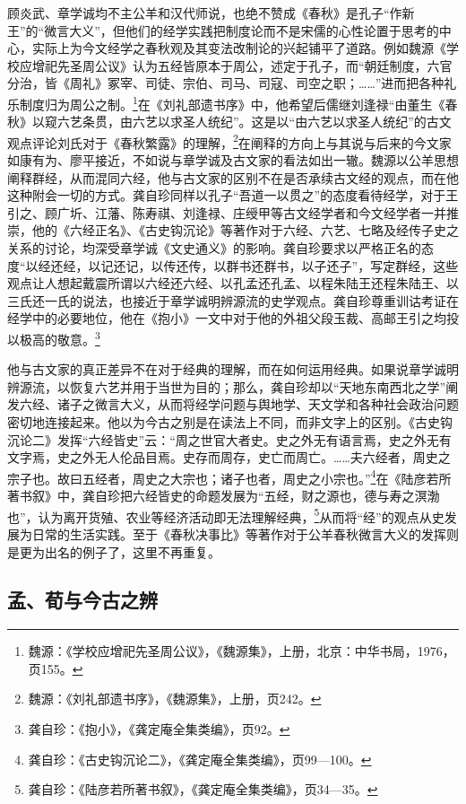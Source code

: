 \documentclass[a4paper, 12pt, openright]{ctexbook}
\begin{document}
顾炎武、章学诚均不主公羊和汉代师说，也绝不赞成《春秋》是孔子“作新王”的“微言大义”，但他们的经学实践把制度论而不是宋儒的心性论置于思考的中心，实际上为今文经学之春秋观及其变法改制论的兴起铺平了道路。例如魏源《学校应增祀先圣周公议》认为五经皆原本于周公，述定于孔子，而“朝廷制度，六官分治，皆《周礼》冢宰、司徒、宗伯、司马、司寇、司空之职；……”进而把各种礼乐制度归为周公之制。\footnote{魏源：《学校应增祀先圣周公议》，《魏源集》，上册，北京：中华书局，1976，页155。}在《刘礼部遗书序》中，他希望后儒继刘逢禄“由董生《春秋》以窥六艺条贯，由六艺以求圣人统纪”。这是以“由六艺以求圣人统纪”的古文观点评论刘氏对于《春秋繁露》的理解，\footnote{魏源：《刘礼部遗书序》，《魏源集》，上册，页242。}在阐释的方向上与其说与后来的今文家如康有为、廖平接近，不如说与章学诚及古文家的看法如出一辙。魏源以公羊思想阐释群经，从而混同六经，他与古文家的区别不在是否承续古文经的观点，而在他这种附会一切的方式。龚自珍同样以孔子“吾道一以贯之”的态度看待经学，对于王引之、顾广圻、江藩、陈寿祺、刘逢禄、庄绶甲等古文经学者和今文经学者一并推崇，他的《六经正名》、《古史钩沉论》等著作对于六经、六艺、七略及经传子史之关系的讨论，均深受章学诚《文史通义》的影响。龚自珍要求以严格正名的态度“以经还经，以记还记，以传还传，以群书还群书，以子还子”，写定群经，这些观点让人想起戴震所谓以六经还六经、以孔孟还孔孟、以程朱陆王还程朱陆王、以三氏还一氏的说法，也接近于章学诚明辨源流的史学观点。龚自珍尊重训诂考证在经学中的必要地位，他在《抱小》一文中对于他的外祖父段玉裁、高邮王引之均投以极高的敬意。\footnote{龚自珍：《抱小》，《龚定庵全集类编》，页92。}

他与古文家的真正差异不在对于经典的理解，而在如何运用经典。如果说章学诚明辨源流，以恢复六艺并用于当世为目的；那么，龚自珍却以“天地东南西北之学”阐发六经、诸子之微言大义，从而将经学问题与舆地学、天文学和各种社会政治问题密切地连接起来。他以为今古之别是在读法上不同，而非文字上的区别。《古史钩沉论二》发挥“六经皆史”云：“周之世官大者史。史之外无有语言焉，史之外无有文字焉，史之外无人伦品目焉。史存而周存，史亡而周亡。……夫六经者，周史之宗子也。故曰五经者，周史之大宗也；诸子也者，周史之小宗也。”\footnote{龚自珍：《古史钩沉论二》，《龚定庵全集类编》，页99—100。}在《陆彦若所著书叙》中，龚自珍把六经皆史的命题发展为“五经，财之源也，德与寿之溟渤也”，认为离开货殖、农业等经济活动即无法理解经典，\footnote{龚自珍：《陆彦若所著书叙》，《龚定庵全集类编》，页34—35。}从而将“经”的观点从史发展为日常的生活实践。至于《春秋决事比》等著作对于公羊春秋微言大义的发挥则是更为出名的例子了，这里不再重复。

\subsection{孟、荀与今古之辨}
\end{document}
